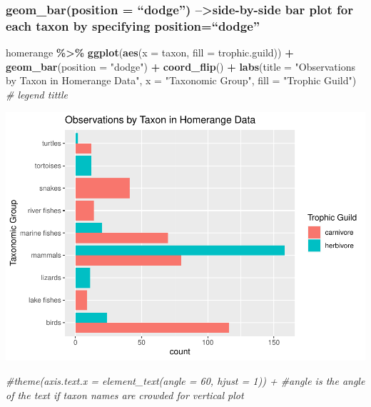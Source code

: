 \documentclass[
]{article}
\newenvironment{Shaded}{\begin{snugshade}}{\end{snugshade}}
\newcommand{\AttributeTok}[1]{\textcolor[rgb]{0.13,0.29,0.53}{#1}}
\newcommand{\CommentTok}[1]{\textcolor[rgb]{0.56,0.35,0.01}{\textit{#1}}}
\newcommand{\FunctionTok}[1]{\textcolor[rgb]{0.13,0.29,0.53}{\textbf{#1}}}
\newcommand{\NormalTok}[1]{#1}
\newcommand{\SpecialCharTok}[1]{\textcolor[rgb]{0.81,0.36,0.00}{\textbf{#1}}}
\newcommand{\StringTok}[1]{\textcolor[rgb]{0.31,0.60,0.02}{#1}}
\begin{document}
\hypertarget{geom_barposition-dodge-side-by-side-bar-plot-for-each-taxon-by-specifying-positiondodge}{%
\subsubsection{geom\_bar(position = ``dodge'')
--\textgreater side-by-side bar plot for each taxon by specifying
position=``dodge''}\label{geom_barposition-dodge-side-by-side-bar-plot-for-each-taxon-by-specifying-positiondodge}}

\begin{Shaded}
\begin{Highlighting}[]
\NormalTok{homerange }\SpecialCharTok{\%\textgreater{}\%} 
  \FunctionTok{ggplot}\NormalTok{(}\FunctionTok{aes}\NormalTok{(}\AttributeTok{x =}\NormalTok{ taxon, }\AttributeTok{fill =}\NormalTok{ trophic.guild)) }\SpecialCharTok{+} 
  \FunctionTok{geom\_bar}\NormalTok{(}\AttributeTok{position =} \StringTok{"dodge"}\NormalTok{) }\SpecialCharTok{+}
  \FunctionTok{coord\_flip}\NormalTok{() }\SpecialCharTok{+}
  \FunctionTok{labs}\NormalTok{(}\AttributeTok{title =} \StringTok{"Observations by Taxon in Homerange Data"}\NormalTok{,}
       \AttributeTok{x =} \StringTok{"Taxonomic Group"}\NormalTok{,}
       \AttributeTok{fill =} \StringTok{"Trophic Guild"}\NormalTok{) }\CommentTok{\# legend tittle }
\end{Highlighting}
\end{Shaded}

\includegraphics{Untitled_files/figure-latex/unnamed-chunk-31-1.pdf}

\begin{Shaded}
\begin{Highlighting}[]
\CommentTok{\#theme(axis.text.x = element\_text(angle = 60, hjust = 1)) + \#angle is the angle of the text if taxon names are crowded for vertical plot}
\end{Highlighting}
\end{Shaded}
\end{document}
